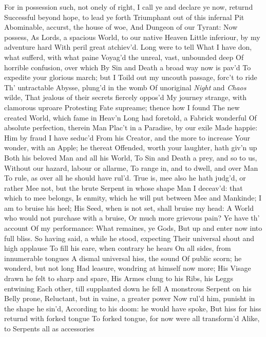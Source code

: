 \documentclass[11pt]{book}
\begin{document}
For in possession such, not onely of right, 
I call ye and declare ye now, returnd 
Successful beyond hope, to lead ye forth 
Triumphant out of this infernal Pit 
Abominable, accurst, the house of woe, 
And Dungeon of our Tyrant: Now possess, 
As Lords, a spacious World, to our native Heaven 
Little inferiour, by my adventure hard 
With peril great atchiev'd.  Long were to tell 
What I have don, what sufferd, with what paine 
Voyag'd the unreal, vast, unbounded deep 
Of horrible confusion, over which 
By Sin and Death a broad way now is pav'd 
To expedite your glorious march; but I 
Toild out my uncouth passage, forc't to ride 
Th' untractable Abysse, plung'd in the womb 
Of unoriginal \textit{Night} and \textit{Chaos} wilde, 
That jealous of their secrets fiercely oppos'd 
My journey strange, with clamorous uproare 
Protesting Fate supreame; thence how I found 
The new created World, which fame in Heav'n 
Long had foretold, a Fabrick wonderful 
Of absolute perfection, therein Man 
Plac't in a Paradise, by our exile 
Made happie: Him by fraud I have seduc'd 
From his Creator, and the more to increase 
Your wonder, with an Apple; he thereat 
Offended, worth your laughter, hath giv'n up 
Both his beloved Man and all his World, 
To Sin and Death a prey, and so to us, 
Without our hazard, labour or allarme, 
To range in, and to dwell, and over Man 
To rule, as over all he should have rul'd. 
True is, mee also he hath judg'd, or rather 
Mee not, but the brute Serpent in whose shape 
Man I deceav'd: that which to mee belongs, 
Is enmity, which he will put between 
Mee and Mankinde; I am to bruise his heel; 
His Seed, when is not set, shall bruise my head: 
A World who would not purchase with a bruise, 
Or much more grievous pain?  Ye have th' account 
Of my performance: What remaines, ye Gods, 
But up and enter now into full bliss. 
\quad So having said, a while he stood, expecting 
Their universal shout and high applause 
To fill his eare, when contrary he hears 
On all sides, from innumerable tongues 
A dismal universal hiss, the sound 
Of public scorn; he wonderd, but not long 
Had leasure, wondring at himself now more; 
His Visage drawn he felt to sharp and spare, 
His Armes clung to his Ribs, his Leggs entwining 
Each other, till supplanted down he fell 
A monstrous Serpent on his Belly prone, 
Reluctant, but in vaine, a greater power 
Now rul'd him, punisht in the shape he sin'd, 
According to his doom: he would have spoke, 
But hiss for hiss returnd with forked tongue 
To forked tongue, for now were all transform'd 
Alike, to Serpents all as accessories 
\end{document}
